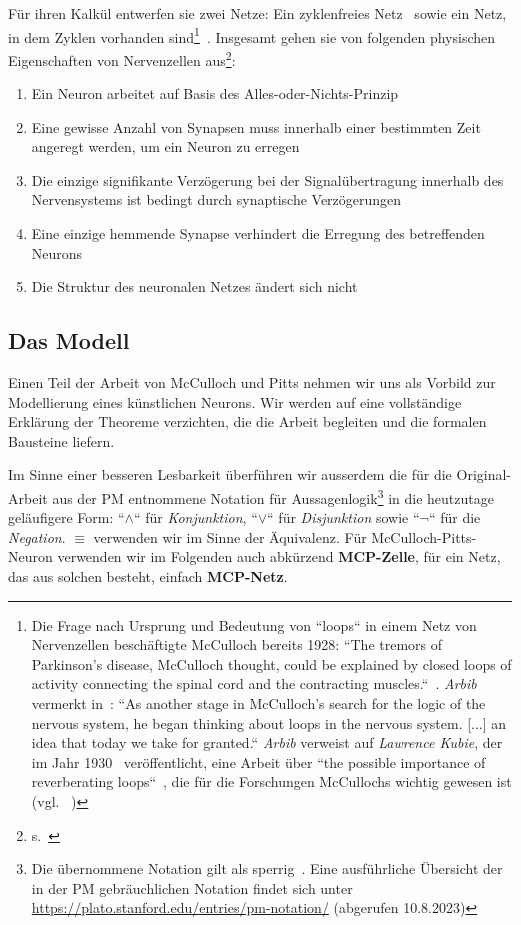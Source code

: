Für ihren Kalkül entwerfen sie zwei Netze: Ein zyklenfreies Netz~\cite[101]{MP43} sowie ein Netz, in dem Zyklen vorhanden sind\footnote{
    Die Frage nach Ursprung und Bedeutung von ``loops`` in einem Netz von Nervenzellen beschäftigte McCulloch bereits 1928: ``The tremors of Parkinson’s disease, McCulloch thought, could be explained by closed loops of activity connecting the spinal cord and the contracting muscles.``~\cite[178]{Pic04}. \textit{Arbib} vermerkt in~\cite[3]{Arb19}: ``As another stage in McCulloch's search for the logic of the nervous system, he began thinking about loops in the nervous system. [...] an idea that today we take for granted.`` \textit{Arbib} verweist auf \textit{Lawrence Kubie}, der im Jahr 1930~\cite{Kub30} veröffentlicht, eine Arbeit über ``the possible importance of reverberating loops``~\cite[5]{Arb19}, die für die Forschungen McCullochs wichtig gewesen ist (vgl. ~\cite[5]{Arb19})
}~\cite[108]{MP43}. Insgesamt gehen sie von folgenden physischen Eigenschaften von Nervenzellen aus\footnote{s.~\cite[101]{MP43}}:


\begin{enumerate}
    \item Ein Neuron arbeitet auf Basis des Alles-oder-Nichts-Prinzip
    \item Eine gewisse Anzahl von Synapsen muss innerhalb einer bestimmten Zeit angeregt werden, um ein Neuron zu erregen
    \item Die einzige signifikante Verzögerung bei der Signalübertragung innerhalb des Nervensystems ist bedingt durch synaptische Verzögerungen
    \item Eine einzige hemmende Synapse verhindert die Erregung des betreffenden Neurons
    \item Die Struktur des neuronalen Netzes ändert sich nicht
\end{enumerate}


\subsection{Das Modell}

Einen Teil der Arbeit von McCulloch und Pitts nehmen wir uns als Vorbild zur Modellierung eines künstlichen Neurons.
Wir werden auf eine vollständige Erklärung der Theoreme verzichten, die die Arbeit begleiten und die formalen Bausteine liefern.

Im Sinne einer besseren Lesbarkeit überführen wir ausserdem die für die Original-Arbeit aus der PM entnommene Notation für Aussagenlogik\footnote{
    Die übernommene Notation gilt als sperrig~\cite[16]{AR88}. Eine ausführliche Übersicht der in der PM gebräuchlichen Notation findet sich unter \url{https://plato.stanford.edu/entries/pm-notation/} (abgerufen 10.8.2023)
} in die heutzutage geläufigere Form: ``$\land$`` für \textit{Konjunktion}, ``$\lor$`` für \textit{Disjunktion} sowie ``$\neg$`` für die \textit{Negation}. $\equiv$ verwenden wir im Sinne der Äquivalenz.
Für McCulloch-Pitts-Neuron verwenden wir im Folgenden auch abkürzend \textbf{MCP-Zelle}, für ein Netz, das aus solchen besteht, einfach \textbf{MCP-Netz}.\\



